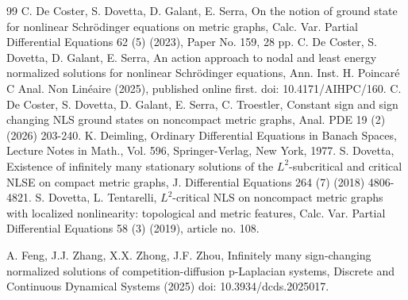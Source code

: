 \documentclass[10pt,a4paper]{article}
\theoremstyle{definition} \theoremstyle{remark}
\numberwithin{equation}{section}
\newcommand{\R}{\mathbb{R}}
\begin{document}
\begin{thebibliography}{99}
	 C. De Coster, S. Dovetta, D. Galant, E. Serra, On the notion of ground state for nonlinear Schrödinger equations on metric graphs, Calc. Var. Partial Differential Equations 62 (5) (2023), Paper No. 159, 28 pp.
	 C. De Coster, S. Dovetta, D. Galant, E. Serra, An action approach to nodal and least energy normalized solutions for nonlinear Schr\"odinger equations, Ann. Inst. H. Poincar\'e C Anal. Non Lin\'eaire (2025), published online first. doi: 10.4171/AIHPC/160.
	 C. De Coster, S. Dovetta, D. Galant, E. Serra, C. Troestler, Constant sign and sign changing NLS ground states on noncompact metric graphs, Anal. PDE 19 (2) (2026) 203-240.
	  K. Deimling, Ordinary Differential Equations in Banach Spaces, Lecture Notes in Math., Vol. 596, Springer-Verlag, New York, 1977.
	  S. Dovetta, Existence of infinitely many stationary solutions of the $L^2$-subcritical and critical NLSE on compact metric graphs, J. Differential Equations 264 (7) (2018) 4806-4821.
	  S. Dovetta, L. Tentarelli, $L^2$-critical NLS on noncompact metric graphs with localized nonlinearity: topological and metric features, Calc. Var. Partial Differential Equations 58 (3) (2019), article no. 108.
	

	A. Feng, J.J. Zhang, X.X. Zhong, J.F. Zhou, Infinitely many sign-changing normalized solutions of competition-diffusion p-Laplacian systems, Discrete and Continuous Dynamical Systems (2025) doi: 10.3934/dcds.2025017.
	
	
	

\end{thebibliography}
\end{document}
